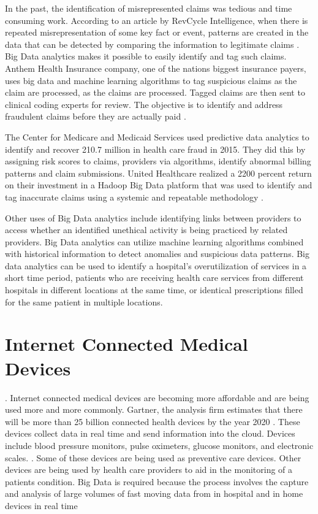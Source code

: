 \documentclass[sigconf]{acmart}
\begin{document}
In the past, the identification of misrepresented claims was tedious and time consuming work.  According to an article by RevCycle Intelligence, when there is repeated misrepresentation of some key fact or event, patterns are created in the data that can be detected by comparing the information to legitimate claims \cite{www-google-datameer}.  Big Data analytics makes it possible to easily identify and tag such claims. Anthem Health Insurance company, one of the nations biggest insurance payers, uses big data and machine learning algorithms to tag suspicious claims as the claim are processed,  as the claims are processed. Tagged claims are then sent to clinical coding experts for review. The objective is to identify and address fraudulent claims before they are actually paid \cite{www-google-datameer}.

The Center for Medicare and Medicaid Services used predictive data analytics to identify and recover 210.7 million in health care fraud in 2015. They did this by assigning risk scores to claims, providers via algorithms, identify abnormal billing patterns and claim submissions.  United Healthcare realized a 2200 percent return on their investment in a Hadoop Big Data platform that was used to identify and tag inaccurate claims using a systemic and repeatable methodology \cite{www-google-McDonald}.

Other uses of Big Data analytics include identifying links between providers to access whether an identified unethical activity is being practiced by related providers.  Big Data analytics can utilize machine learning algorithms combined with historical information to detect anomalies and suspicious data patterns. Big data analytics can be used to identify a hospital’s overutilization of services in a short time period, patients who are receiving health care services from different hospitals in different locations at the same time, or identical prescriptions filled for the same patient in multiple locations. 


\section{Internet Connected Medical Devices}. 
Internet connected medical devices are becoming more affordable and are being used more and more commonly.  Gartner, the analysis firm estimates that there will be more than 25 billion connected health devices by the year 2020 \cite{www-google-HlthCat}. These devices collect data in real time and send information into the cloud. Devices include blood pressure monitors, pulse oximeters, glucose monitors, and electronic scales. \cite{www-google-HlthCat}.  Some of these devices are being used as preventive care devices. Other devices are being used by health care providers to aid in the monitoring of a patients condition.  Big Data is required because the process involves the capture and analysis of large volumes of fast moving data from in hospital and in home devices in real time
\end{document}

